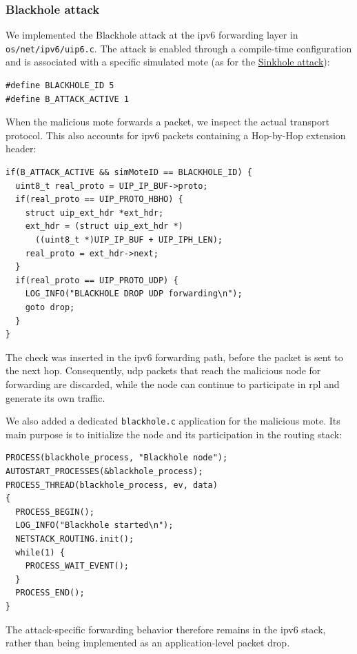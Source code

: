 \subsubsection{Blackhole attack}
\label{subsubsec:blackhole_implementation}
We implemented the Blackhole attack at the \gls{ipv6} forwarding layer in \texttt{os/net/ipv6/uip6.c}.
The attack is enabled through a compile-time configuration and is associated with a specific simulated mote (as for the \hyperref[subsubsec:sinkhole_implementation]{Sinkhole attack}):

\begin{verbatim}
#define BLACKHOLE_ID 5
#define B_ATTACK_ACTIVE 1
\end{verbatim}

When the malicious mote forwards a packet, we inspect the actual transport protocol.
This also accounts for \gls{ipv6} packets containing a Hop-by-Hop extension header:

\begin{verbatim}
if(B_ATTACK_ACTIVE && simMoteID == BLACKHOLE_ID) {
  uint8_t real_proto = UIP_IP_BUF->proto;
  if(real_proto == UIP_PROTO_HBHO) {
    struct uip_ext_hdr *ext_hdr;
    ext_hdr = (struct uip_ext_hdr *)
      ((uint8_t *)UIP_IP_BUF + UIP_IPH_LEN);
    real_proto = ext_hdr->next;
  }
  if(real_proto == UIP_PROTO_UDP) {
    LOG_INFO("BLACKHOLE DROP UDP forwarding\n");
    goto drop;
  }
}
\end{verbatim}

The check was inserted in the \gls{ipv6} forwarding path, before the packet is sent to the next hop.
Consequently, \gls{udp} packets that reach the malicious node for forwarding are discarded, while the node can continue to participate in \gls{rpl} and generate its own traffic.

We also added a dedicated \texttt{blackhole.c} application for the malicious mote.
Its main purpose is to initialize the node and its participation in the routing stack:

\begin{verbatim}
PROCESS(blackhole_process, "Blackhole node");
AUTOSTART_PROCESSES(&blackhole_process);
PROCESS_THREAD(blackhole_process, ev, data)
{
  PROCESS_BEGIN();
  LOG_INFO("Blackhole started\n");
  NETSTACK_ROUTING.init();
  while(1) {
    PROCESS_WAIT_EVENT();
  }
  PROCESS_END();
}
\end{verbatim}

The attack-specific forwarding behavior therefore remains in the \gls{ipv6} stack, rather than being implemented as an application-level packet drop.

